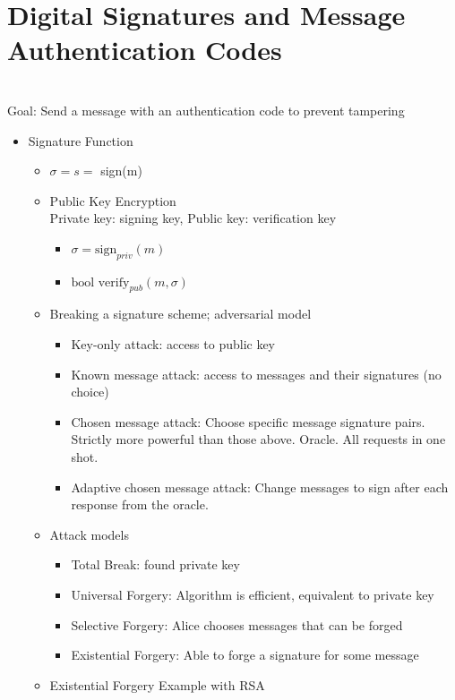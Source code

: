 \section{Digital Signatures and Message Authentication Codes}
\\Goal: Send a message with an authentication code to prevent tampering
\begin{itemize}
\item Signature Function
    \begin{itemize}
    \item $\sigma = s =$ sign(m)
    \item Public Key Encryption
    \\ Private key: signing key, Public key: verification key
        \begin{itemize}
        \item $\sigma = \text{sign}_{priv}(m)$
        \item $\text{bool verify}_{pub}(m, \sigma)$
        \end{itemize}
    \item Breaking a signature scheme; adversarial model
        \begin{itemize}
        \item Key-only attack: access to public key
        \item Known message attack: access to messages and their signatures (no choice)
        \item Chosen message attack: Choose specific message signature pairs. Strictly more powerful than those above. Oracle. All requests in one shot.
        \item Adaptive chosen message attack: Change messages to sign after each response from the oracle.
        \end{itemize}
    \item Attack models
        \begin{itemize}
        \item Total Break: found private key
        \item Universal Forgery: Algorithm is efficient, equivalent to private key
        \item Selective Forgery: Alice chooses messages that can be forged
        \item Existential Forgery: Able to forge a signature for some message
        \end{itemize}
    \item Existential Forgery Example with RSA
        \begin{itemize}

\end{itemize}
\end{itemize}
\end{itemize}
